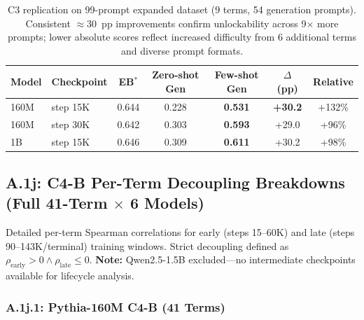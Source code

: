 \documentclass[10pt]{article} %
\begin{document}
\begin{table}[H]
\centering
\small
\begin{tabular}{|l|l|c|c|c|c|c|}
\hline
\textbf{Model} & \textbf{Checkpoint} & \textbf{EB$^*$} & \textbf{Zero-shot Gen} & \textbf{Few-shot Gen} & \textbf{$\Delta$ (pp)} & \textbf{Relative} \\
\hline
160M & step 15K & 0.644 & 0.228 & \textbf{0.531} & \textbf{+30.2} & +132\% \\
160M & step 30K & 0.642 & 0.303 & \textbf{0.593} & +29.0 & +96\% \\
1B & step 15K & 0.646 & 0.309 & \textbf{0.611} & +30.2 & +98\% \\
\hline
\end{tabular}
\caption{C3 replication on 99-prompt expanded dataset (9 terms, 54 generation prompts). Consistent $\approx$30~pp improvements confirm unlockability across 9$\times$ more prompts; lower absolute scores reflect increased difficulty from 6 additional terms and diverse prompt formats.}
\label{tab:c3_99prompt}
\end{table}

\subsection*{A.1j: C4-B Per-Term Decoupling Breakdowns (Full 41-Term $\times$ 6 Models)}\label{sec:a1j_c4b}

Detailed per-term Spearman correlations for early (steps 15--60K) and late (steps 90--143K/terminal) training windows. Strict decoupling defined as $\rho_\text{early} > 0 \land \rho_\text{late} \leq 0$.
\textbf{Note:} Qwen2.5-1.5B excluded---no intermediate checkpoints available for lifecycle analysis.

\subsubsection*{A.1j.1: Pythia-160M C4-B (41 Terms)}
\end{document}
